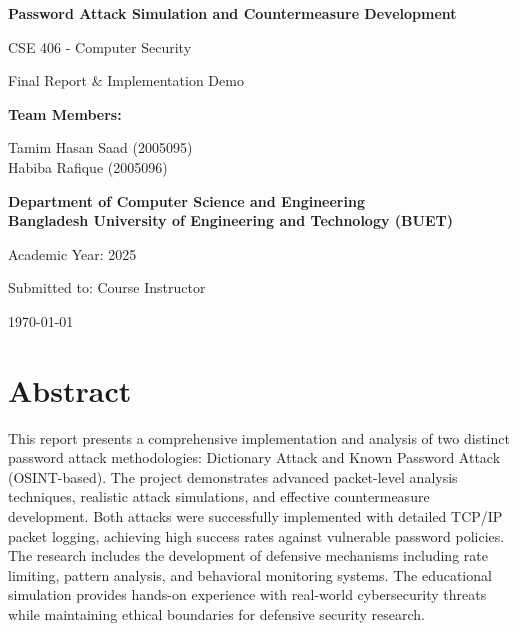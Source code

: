 \documentclass[12pt,a4paper]{article}
\begin{document}
\begin{titlepage}
    \centering
    \vspace*{2cm}
    
    {\huge\bfseries Password Attack Simulation and Countermeasure Development\par}
    \vspace{1cm}
    {\Large CSE 406 - Computer Security\par}
    \vspace{0.5cm}
    {\large Final Report \& Implementation Demo\par}
    \vspace{2cm}
    
    {\Large\bfseries Team Members:\par}
    \vspace{0.5cm}
    {\large 
    Tamim Hasan Saad (2005095)\\
    Habiba Rafique (2005096)\par}
    \vspace{2cm}
    
    {\large\bfseries Department of Computer Science and Engineering\\
    Bangladesh University of Engineering and Technology (BUET)\par}
    \vspace{1cm}
    
    {\large Academic Year: 2025\par}
    \vspace{1cm}
    {\large Submitted to: Course Instructor\par}
    
    \vfill
    {\large \today\par}
\end{titlepage}

\newpage
\section*{Abstract}

This report presents a comprehensive implementation and analysis of two distinct password attack methodologies: Dictionary Attack and Known Password Attack (OSINT-based). The project demonstrates advanced packet-level analysis techniques, realistic attack simulations, and effective countermeasure development. Both attacks were successfully implemented with detailed TCP/IP packet logging, achieving high success rates against vulnerable password policies. The research includes the development of defensive mechanisms including rate limiting, pattern analysis, and behavioral monitoring systems. The educational simulation provides hands-on experience with real-world cybersecurity threats while maintaining ethical boundaries for defensive security research.
\end{document}
